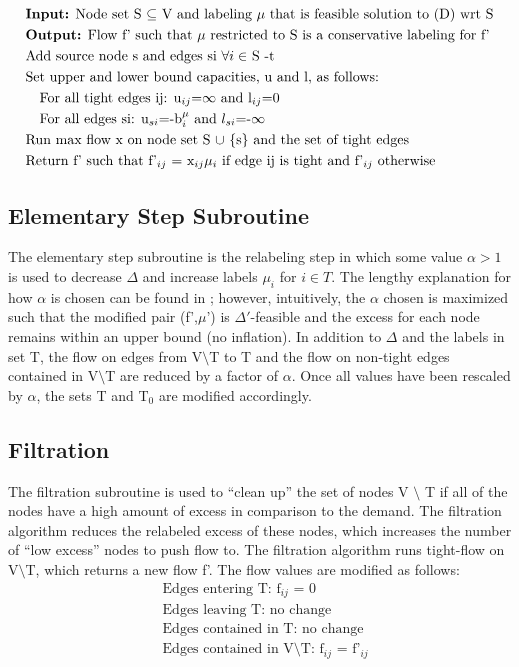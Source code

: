 \documentclass[11pt]{article}
\theoremstyle{definition}
\theoremstyle{definition}
\begin{document}
	\begin{align*}
	&\text{\textbf{Input:} Node set S $\subseteq$ V and labeling $\mu$ that is feasible solution to (D) wrt S} \\
	&\text{\textbf{Output:} Flow f' such that $\mu$ restricted to S is a conservative labeling for f'} \\
	&\text{Add source node s and edges si $\forall i \in$ S -t} \\
	&\text{Set upper and lower bound capacities, u and l, as follows: } \\
	&\quad \text{For all tight edges ij: u$_{ij}$=$\infty$ and l$_{ij}$=0} \\
	&\quad \text{For all edges si: u$_{si}$=-b$_i^\mu$ and $l_{si}$=-$\infty$} \\
	&\text{Run max flow x on node set S $\cup$ $\{$s$\}$ and the set of tight edges} \\
	&\text{Return f' such that f'$_{ij}$ = x$_{ij}\mu_i$ if edge ij is tight and f'$_{ij}$ otherwise}
	\end{align*}
	
	\subsection{Elementary Step Subroutine}
	The elementary step subroutine is the relabeling step in which some value $\alpha > 1$ is used to decrease $\Delta$ and increase labels $\mu_i$ for $i \in T$. The lengthy explanation for how $\alpha$ is chosen can be found in \cite{article}; however, intuitively, the $\alpha$ chosen is maximized such that the modified pair (f',$\mu$') is $\Delta'$-feasible and the excess for each node remains within an upper bound (no inflation). In addition to $\Delta$ and the labels in set T, the flow on edges from V$\setminus$T to T and the flow on non-tight edges contained in V$\setminus$T are reduced by a factor of $\alpha$. Once all values have been rescaled by $\alpha$, the sets T and T$_0$ are modified accordingly.  
	
	\subsection{Filtration}
	The filtration subroutine is used to ``clean up'' the set of nodes V $\setminus$ T if all of the nodes have a high amount of excess in comparison to the demand. The filtration algorithm reduces the relabeled excess of these nodes, which increases the number of ``low excess'' nodes to push flow to. The filtration algorithm runs tight-flow on V$\setminus$T, which returns a new flow f'. The flow values are modified as follows: 
	\begin{align*}
	&\text{Edges entering T: f$_{ij}$ = 0} \\ 
	&\text{Edges leaving T: no change} \\
	&\text{Edges contained in T: no change} \\
	&\text{Edges contained in V$\setminus$T: f$_{ij}$ = f'$_{ij}$}
	\end{align*}
	
\end{document}
